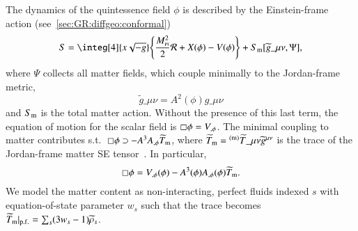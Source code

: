    The dynamics of the quintessence field $\phi$ is described by the Einstein-frame action (see~\cref{sec:GR:diffgeo:conformal})
    \begin{equation}\label{eq:cosmo:quintessence:quintessence_action_Einstein}
        S =\integ[4]{x\sqrt{-g}} \cclosed{ \frac{M\nped{Pl}^2}{2} \mathcal{R} + X(\phi) - V(\phi)} + S\ped{m}[\widetilde{g}\_{\mu\nu} , \Psi],
    \end{equation} 
    where $\Psi$ collects all matter fields, which couple minimally to the Jordan-frame metric,
    \begin{equation}
        \widetilde{g}\_{\mu\nu} = A^2 (\phi) g\_{\mu\nu}%
    \end{equation}
    and $S_\mathrm{m}$ is the total matter action. 
    Without the presence of this last term, the equation of motion for the scalar field is $\sq \phi = V_{,\phi}$. %
    The minimal coupling to matter contributes s.t.~$\sq\phi \supset - A^{3} A_{,\phi}\widetilde{T}\ped{m}$, where $\widetilde{T}\ped{m}= {}\ap{(m)}\widetilde{T}\_{\mu\nu}\widetilde{g}\^{\mu\nu}$ is the trace of the Jordan-frame matter SE tensor~\citep{hinterbichlerSymmetronCosmology2011,christiansenAsevolutionRelativisticNbody2023}. In particular, 
    \begin{equation}
        \sq\phi = V_{,\phi}(\phi) - A^{3}(\phi) A_{,\phi}(\phi)\widetilde{T}\ped{m}.
    \end{equation}
    We model the matter content as non-interacting, perfect fluids indexed $s$ with equation-of-state parameter $w_s$ such that the trace becomes $\widetilde{T}_\mathrm{m}\rvert_\mathrm{p.f.} = \sum_s (3w_s-1 )\widetilde{\rho}_s$.  

